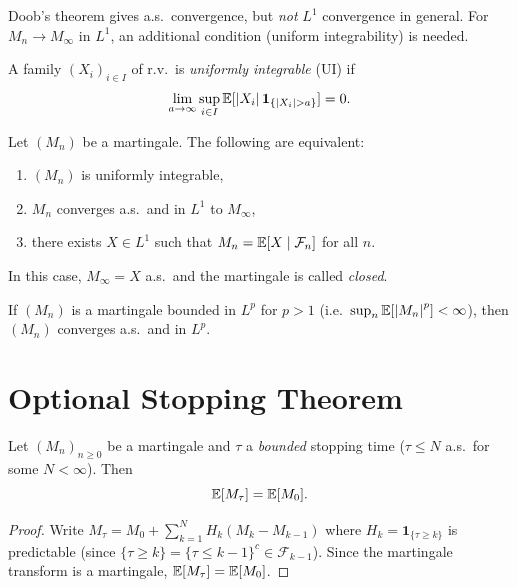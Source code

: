 \begin{warning}[title=\textbf{A.s.\ vs.\ $L^1$ Convergence}]
Doob's theorem gives a.s.\ convergence, but \emph{not} $L^1$ convergence in
general. For $M_n \to M_{\infty}$ in $L^1$, an additional condition (uniform
integrability) is needed.
\end{warning}

\begin{definition}
A family $(X_i)_{i \in I}$ of r.v.\ is \emph{uniformly integrable} (UI) if
\[
  \lim_{a \to \infty} \sup_{i \in I} \mathbb{E}[\left| X_i \right| \mathbf{1}_{\{\left| X_i \right| > a\}}] = 0.
\]
\end{definition}

\begin{theorem}[$L^1$ Convergence]
\label{thm:L1_convergence}
Let $(M_n)$ be a martingale. The following are equivalent:
\begin{enumerate}
  \item $(M_n)$ is uniformly integrable,
  \item $M_n$ converges a.s.\ and in $L^1$ to $M_{\infty}$,
  \item there exists $X \in L^1$ such that $M_n = \mathbb{E}[X \mid \mathcal{F}_n]$ for all $n$.
\end{enumerate}
In this case, $M_{\infty} = X$ a.s.\ and the martingale is called \emph{closed}.
\end{theorem}

\begin{corollary}
If $(M_n)$ is a martingale bounded in $L^p$ for $p > 1$ (i.e.\
$\sup_n \mathbb{E}[\left| M_n \right|^p] < \infty$), then $(M_n)$ converges a.s.\ and in $L^p$.
\end{corollary}

\section{Optional Stopping Theorem}

\begin{theorem}
\label{thm:ost_bounded}
Let $(M_n)_{n \geq 0}$ be a martingale and $\tau$ a \emph{bounded} stopping time
($\tau \leq N$ a.s.\ for some $N < \infty$). Then
\[
  \mathbb{E}[M_{\tau}] = \mathbb{E}[M_0].
\]
\end{theorem}

\begin{proof}
Write $M_{\tau} = M_0 + \sum_{k=1}^N H_k (M_k - M_{k-1})$ where
$H_k = \mathbf{1}_{\{\tau \geq k\}}$ is predictable (since
$\{\tau \geq k\} = \{\tau \leq k-1\}^c \in \mathcal{F}_{k-1}$). Since the
martingale transform is a martingale, $\mathbb{E}[M_{\tau}] = \mathbb{E}[M_0]$.
\end{proof}

